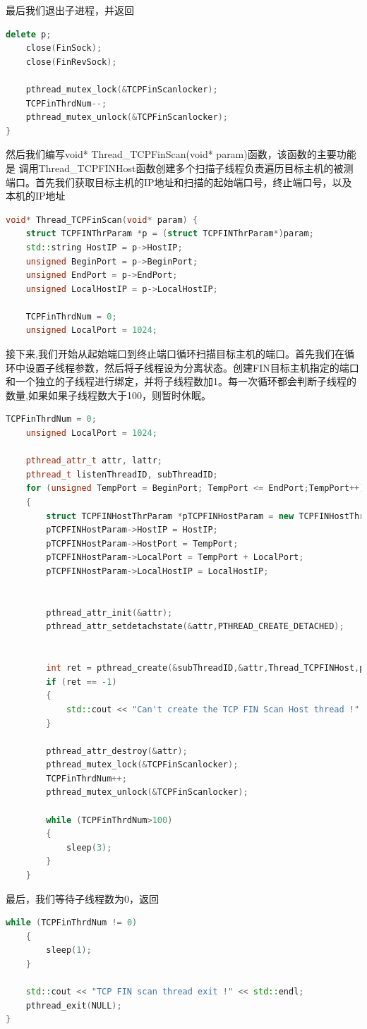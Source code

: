 \documentclass[UTF8,a4paper,10pt]{ctexart}
\begin{document}
最后我们退出子进程，并返回
\begin{lstlisting}[language = C++]
    delete p;
    close(FinSock);
	close(FinRevSock);

	pthread_mutex_lock(&TCPFinScanlocker);
    TCPFinThrdNum--;
	pthread_mutex_unlock(&TCPFinScanlocker);
}
\end{lstlisting}
然后我们编写void* Thread\_TCPFinScan(void* param)函数，该函数的主要功能是
调用Thread\_TCPFINHost函数创建多个扫描子线程负责遍历目标主机的被测端口。首先我们获取目标主机的IP地址和扫描的起始端口号，终止端口号，以及本机的IP地址
\begin{lstlisting}[language = C++]
void* Thread_TCPFinScan(void* param) {
	struct TCPFINThrParam *p = (struct TCPFINThrParam*)param;
	std::string HostIP = p->HostIP;
	unsigned BeginPort = p->BeginPort;
	unsigned EndPort = p->EndPort;
	unsigned LocalHostIP = p->LocalHostIP;

	TCPFinThrdNum = 0;
	unsigned LocalPort = 1024;
\end{lstlisting}
接下来,我们开始从起始端口到终止端口循环扫描目标主机的端口。首先我们在循环中设置子线程参数，然后将子线程设为分离状态。创建FIN目标主机指定的端口和一个独立的子线程进行绑定，并将子线程数加1。每一次循环都会判断子线程的数量,如果如果子线程数大于100，则暂时休眠。
\begin{lstlisting}[language = C++]
    TCPFinThrdNum = 0;
	unsigned LocalPort = 1024;

    pthread_attr_t attr, lattr;
    pthread_t listenThreadID, subThreadID;
	for (unsigned TempPort = BeginPort; TempPort <= EndPort;TempPort++) 
	{
        struct TCPFINHostThrParam *pTCPFINHostParam = new TCPFINHostThrParam;
        pTCPFINHostParam->HostIP = HostIP;
		pTCPFINHostParam->HostPort = TempPort;
        pTCPFINHostParam->LocalPort = TempPort + LocalPort;
		pTCPFINHostParam->LocalHostIP = LocalHostIP;


		pthread_attr_init(&attr);
        pthread_attr_setdetachstate(&attr,PTHREAD_CREATE_DETACHED);
                

		int ret = pthread_create(&subThreadID,&attr,Thread_TCPFINHost,pTCPFINHostParam);
		if (ret == -1) 
		{
			std::cout << "Can't create the TCP FIN Scan Host thread !" << std::endl;
		}

		pthread_attr_destroy(&attr);
		pthread_mutex_lock(&TCPFinScanlocker);
        TCPFinThrdNum++;
		pthread_mutex_unlock(&TCPFinScanlocker);

		while (TCPFinThrdNum>100)
		{
			sleep(3);
		}
	}
\end{lstlisting}
最后，我们等待子线程数为0，返回
\begin{lstlisting}[language = C++]
    while (TCPFinThrdNum != 0)
	{
		sleep(1);
	}

    std::cout << "TCP FIN scan thread exit !" << std::endl;
	pthread_exit(NULL);
}
\end{lstlisting}
\end{document}
